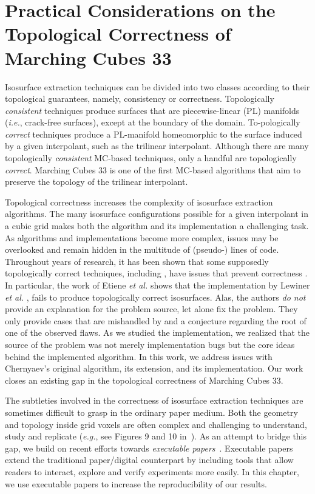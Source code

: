 \chapter{Practical Considerations on the Topological Correctness of Marching Cubes 33}
\label{chap:mc33}

Isosurface extraction techniques can be divided into two classes according to their topological guarantees, namely, consistency or correctness. Topologically \emph{consistent} techniques produce surfaces that are piecewise-linear (PL) manifolds (\emph{i.e.}, crack-free surfaces), except at the boundary of the domain. To-pologically \emph{correct} techniques produce a PL-manifold homeomorphic to the surface induced by a given interpolant, such as the trilinear interpolant. Although there are many topologically \emph{consistent} MC-based techniques, only a handful are topologically \emph{correct}. Marching Cubes 33 is one of the first MC-based algorithms that aim to preserve the topology of the trilinear interpolant.

Topological correctness increases the complexity of isosurface extraction algorithms. 
The many isosurface configurations possible for a given interpolant in a cubic grid makes both the algorithm and its implementation a challenging task. 
%
As algorithms and implementations become more complex, issues may be overlooked and remain hidden in the multitude of (pseudo-) lines of code.
%
Throughout years of research, it has been shown that some supposedly topologically correct techniques, including \mc, have issues that prevent correctness  \cite{Etiene:2012:TVI:2197070.2197097, lopes:tvcg:2003, newman:candg:2006}. 
%
In particular, the work of Etiene \emph{et al.} \cite{Etiene:2012:TVI:2197070.2197097} shows that the \mc{} implementation by Lewiner \emph{et al.} \cite{lewiner:impl,Lewiner:2003}, fails to produce topologically correct isosurfaces. 
%
Alas, the authors \emph{do not} provide an explanation for the problem source, let alone fix the problem. 
%
They only provide cases that are mishandled by \mc{} and a conjecture regarding  the root of one of the observed flaws.
%
As we studied the \mc{} implementation, we realized that the source of the problem was not merely implementation bugs but the core ideas behind the implemented algorithm.  
%
In this work, we address issues with Chernyaev's original algorithm, its extension, and its implementation. 
%
Our work closes an existing gap in the topological correctness of Marching Cubes 33.
 
 The subtleties involved in the correctness of isosurface extraction techniques are sometimes difficult to grasp in the ordinary paper medium. Both the geometry and topology inside grid voxels are often complex and challenging to understand,  study and replicate ({\em e.g.}, see Figures 9 and 10 in~\cite{Nielson03onmarching}).  As an attempt to bridge this gap, we build on recent efforts towards \emph{executable papers}~\cite{Koop:2011tv, Tohline:2010jn}. Executable papers extend the traditional paper/digital counterpart by including tools that allow readers to interact, explore and verify experiments more easily.  In this chapter, we use executable papers to increase the reproducibility of our results.
 
